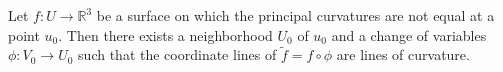 Let $f: U \to \mathbb{R}^3$ be a surface on which the principal curvatures are not equal at a point $u_0$. Then there exists a neighborhood $U_0$ of $u_0$ and a change of variables $\phi: V_0 \to U_0$ such that the coordinate lines of $\tilde{f} = f \circ \phi$ are lines of curvature.
